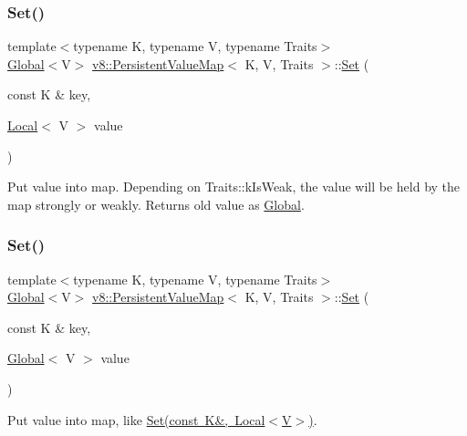 \subsubsection{\texorpdfstring{Set()}{Set()}\hspace{0.1cm}{\footnotesize\ttfamily [1/3]}}
{\footnotesize\ttfamily template$<$typename K, typename V, typename Traits$>$ \\
\mbox{\hyperlink{classv8_1_1Global}{Global}}$<$V$>$ \mbox{\hyperlink{classv8_1_1PersistentValueMap}{v8\+::\+Persistent\+Value\+Map}}$<$ K, V, Traits $>$\+::\mbox{\hyperlink{classv8_1_1Set}{Set}} (\begin{DoxyParamCaption}\item[{const K \&}]{key,  }\item[{\mbox{\hyperlink{classv8_1_1Local}{Local}}$<$ V $>$}]{value }\end{DoxyParamCaption})\hspace{0.3cm}{\ttfamily [inline]}}

Put value into map. Depending on Traits\+::k\+Is\+Weak, the value will be held by the map strongly or weakly. Returns old value as \mbox{\hyperlink{classv8_1_1Global}{Global}}. \mbox{\label{classv8_1_1PersistentValueMap_a00f89f1b7665698349f98b04d0059180}} 
\subsubsection{\texorpdfstring{Set()}{Set()}\hspace{0.1cm}{\footnotesize\ttfamily [2/3]}}
{\footnotesize\ttfamily template$<$typename K, typename V, typename Traits$>$ \\
\mbox{\hyperlink{classv8_1_1Global}{Global}}$<$V$>$ \mbox{\hyperlink{classv8_1_1PersistentValueMap}{v8\+::\+Persistent\+Value\+Map}}$<$ K, V, Traits $>$\+::\mbox{\hyperlink{classv8_1_1Set}{Set}} (\begin{DoxyParamCaption}\item[{const K \&}]{key,  }\item[{\mbox{\hyperlink{classv8_1_1Global}{Global}}$<$ V $>$}]{value }\end{DoxyParamCaption})\hspace{0.3cm}{\ttfamily [inline]}}

Put value into map, like \mbox{\hyperlink{classv8_1_1PersistentValueMap_a4527a2e1b25a9f1772317f948382d9f9}{Set(const K\&, Local$<$\+V$>$)}}. \mbox{\label{classv8_1_1PersistentValueMap_a8128f8cff6ed0f3177e966b28cc081ba}} 
